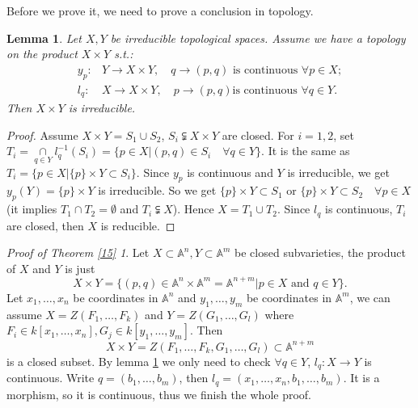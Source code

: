 \documentclass{amsart}
\theoremstyle{plain}
\newtheorem{lemma}{Lemma}
\theoremstyle{definition}
\theoremstyle{remark}
\newtheorem*{proofofproductsofaffinevarieties}{Proof of Theorem \ref{15}}
\numberwithin{equation}{section}
\begin{document}
Before we prove it, we need to prove a conclusion in topology.
\begin{lemma}\label{16}
	Let $ X,Y $ be irreducible topological spaces. Assume we have a topology on the product $ X\times Y $ s.t.:
	$$\begin{array}{cc}
	y_p: & Y\to X\times Y, \quad q\to (p,q) \text{ is continuous }\forall p\in X;\\
	l_q: & X\to X\times Y, \quad p\to (p,q) \text{is continuous }\forall q\in Y.
	\end{array}$$
	Then $ X\times Y $ is irreducible.
\end{lemma}
\begin{proof}
	Assume $ X\times Y=S_1\cup S_2 $, $ S_i\subsetneqq X\times Y $ are closed. For $ i=1,2 $, set $ T_i=\mathop{\cap}\limits_{q\in Y}l_q^{-1}(S_i)=\{ p\in X|(p,q)\in S_i \quad\forall q\in Y \} $. It is the same as $ T_i=\{ p\in X|\{ p \}\times Y\subset S_i \} $. Since $ y_p $ is continuous and $ Y $ is irreducible, we get $ y_p(Y)=\{p\}\times Y $ is irreducible. So we get $ \{p\}\times Y\subset S_1 $ or $ \{p\}\times Y\subset S_2 \quad\forall p\in X$(it implies $ T_1\cap T_2=\emptyset $ and $ T_i\subsetneqq X $). Hence $ X=T_1\cup T_2 $. Since $ l_q $ is continuous, $ T_i $ are closed, then $ X $ is reducible.
\end{proof}
\begin{proofofproductsofaffinevarieties}
	Let $ X\subset \mathbb{A}^n,Y\subset \mathbb{A}^m $ be closed subvarieties, the product of $ X $ and $ Y $ is just
	$$
	X\times Y=\{ (p,q)\in \mathbb{A}^n\times \mathbb{A}^m=\mathbb{A}^{n+m}|p\in X \text{ and }q\in Y \}.
	$$
	Let $ x_1,\dots,x_n $ be coordinates in $ \mathbb{A}^n $ and $ y_1,\dots,y_m $ be coordinates in $ \mathbb{A}^m $, we can assume $ X=Z(F_1,\dots,F_k) $ and $ Y=Z(G_1,\dots,G_l) $ where $ F_i\in k[x_1,\dots,x_n],G_j\in k[y_1,\dots,y_m] $. Then
	\begin{equation}
	X\times Y= Z(F_1,\dots,F_k,G_1,\dots,G_l)\subset \mathbb{A}^{n+m}
	\end{equation}
	is a closed subset. By lemma \ref{16} we only need to check  $\forall  q\in Y $, $ l_q:X\to Y $ is continuous. Write $ q=(b_1,\dots,b_m) $, then $ l_q=(x_1,\dots,x_n,b_1,\dots,b_m) $. It is a morphism, so it is continuous, thus we finish the whole proof.
\end{proofofproductsofaffinevarieties}
\end{document}
